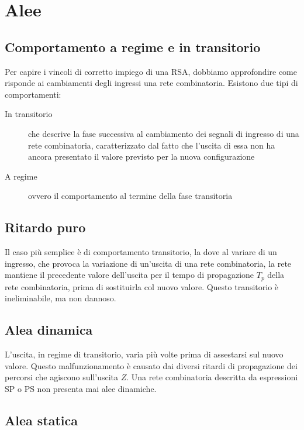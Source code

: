 \documentclass{subfiles}
\begin{document}
\section{Alee}

\subsection{Comportamento a regime e in transitorio}

Per capire i vincoli di corretto impiego di una RSA, dobbiamo approfondire come risponde ai cambiamenti degli ingressi una rete combinatoria.
Esistono due tipi di comportamenti:

\begin{description}
    \item[In transitorio] che descrive la fase successiva al cambiamento dei segnali di ingresso di una rete combinatoria, caratterizzato dal fatto che l'uscita di essa non ha ancora presentato il valore previsto per la nuova configurazione
    \item[A regime] ovvero il comportamento al termine della fase transitoria
\end{description}

\subsection{Ritardo puro}

Il caso più semplice è di comportamento transitorio, la dove al variare di un ingresso, che provoca la variazione di un'uscita di una rete combinatoria, la rete mantiene il precedente valore dell'uscita per il tempo di propagazione $T_p$ della rete combinatoria, prima di sostituirla col nuovo valore.
Questo transitorio è ineliminabile, ma non dannoso.

\subsection{Alea dinamica}

L'uscita, in regime di transitorio, varia più volte prima di assestarsi sul nuovo valore.
Questo malfunzionamento è causato dai diversi ritardi di propagazione dei percorsi che agiscono sull'uscita $Z$.
Una rete combinatoria descritta da espressioni SP o PS non presenta mai alee dinamiche.

\subsection{Alea statica}
\end{document}
